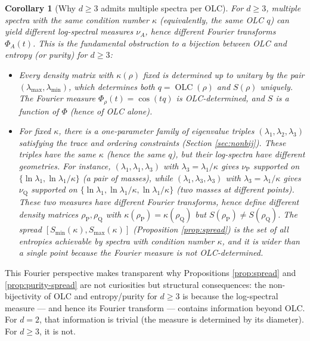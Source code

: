 \documentclass{article}
\newtheorem{corollary}[theorem]{Corollary}
\theoremstyle{remark}
\providecommand{\QLC}{\operatorname{OLC}}
\begin{document}
\begin{corollary}[Why $d\ge3$ admits multiple spectra per OLC]\label{cor:fourier-nonbij}
For $d\ge3$, multiple spectra with the same condition number $\kappa$ (equivalently, the same OLC $q$) can yield \emph{different} log-spectral measures $\nu_A$, hence different Fourier transforms $\Phi_A(t)$. This is the fundamental obstruction to a bijection between OLC and entropy (or purity) for $d\ge3$:
\begin{itemize}
\item[\textit{d=2}:] Every density matrix with $\kappa(\rho)$ fixed is determined up to unitary by the pair $(\lambda_{\max},\lambda_{\min})$, which determines both $q=\QLC(\rho)$ and $S(\rho)$ uniquely. The Fourier measure $\Phi_\rho(t)=\cos(tq)$ is OLC-determined, and $S$ is a function of $\Phi$ (hence of OLC alone).
\item[\textit{d=3}:] For fixed $\kappa$, there is a one-parameter family of eigenvalue triples $(\lambda_1,\lambda_2,\lambda_3)$ satisfying the trace and ordering constraints (Section \ref{sec:nonbij}). These triples have the same $\kappa$ (hence the same $q$), but their log-spectra have different geometries. For instance, $(\lambda_1,\lambda_1,\lambda_3)$ with $\lambda_3=\lambda_1/\kappa$ gives $\nu_{\text{P}}$ supported on $\{\ln\lambda_1, \ln\lambda_1/\kappa\}$ (a pair of masses), while $(\lambda_1,\lambda_3,\lambda_3)$ with $\lambda_3=\lambda_1/\kappa$ gives $\nu_{\text{Q}}$ supported on $\{\ln\lambda_1, \ln\lambda_1/\kappa, \ln\lambda_1/\kappa\}$ (two masses at different points). These two measures have different Fourier transforms, hence define different density matrices $\rho_{\text{P}},\rho_{\text{Q}}$ with $\kappa(\rho_{\text{P}})=\kappa(\rho_{\text{Q}})$ but $S(\rho_{\text{P}})\neq S(\rho_{\text{Q}})$. The spread $[S_{\min}(\kappa),S_{\max}(\kappa)]$ (Proposition \ref{prop:spread}) is the set of all entropies achievable by spectra with condition number $\kappa$, and it is wider than a single point because the Fourier measure is not OLC-determined.
\end{itemize}
\end{corollary}

This Fourier perspective makes transparent why Propositions \ref{prop:spread} and \ref{prop:purity-spread} are not curiosities but structural consequences: the non-bijectivity of OLC and entropy/purity for $d\ge3$ is because the log-spectral measure — and hence its Fourier transform — contains information beyond OLC. For $d=2$, that information is trivial (the measure is determined by its diameter). For $d\ge3$, it is not.
\end{document}
